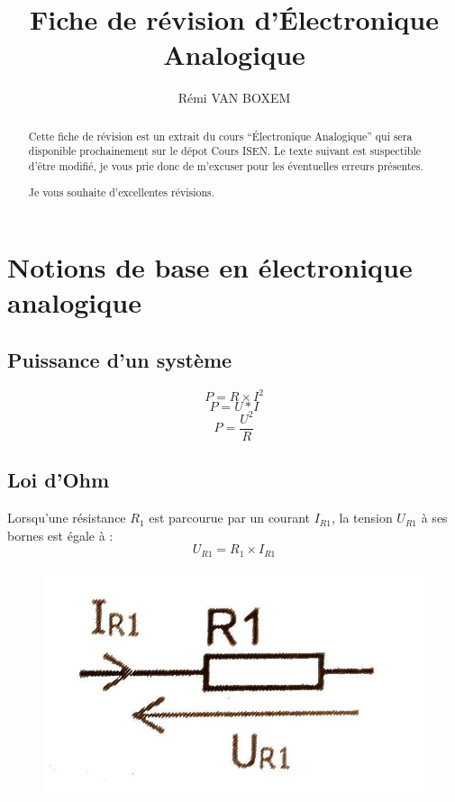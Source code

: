 \documentclass[a4paper,10pt]{article}
\title{Fiche de révision d'Électronique Analogique}
\author{Rémi VAN BOXEM}
\begin{document}
\maketitle

\begin{abstract}
Cette fiche de révision est un extrait du cours ``Électronique Analogique'' qui sera disponible prochainement sur le dépot Cours ISEN. Le texte suivant est suspectible d'être modifié, je vous prie donc de m'excuser pour les éventuelles erreurs présentes.

Je vous souhaite d'excellentes révisions.
\end{abstract}

\tableofcontents

\section{Notions de base en électronique analogique}

\subsection{Puissance d'un système}

$$P = R \times I^2$$ $$P=U*I$$ $$P = \frac{U^2}{R}$$

\subsection{Loi d'Ohm}
Lorsqu'une résistance $R_1$ est parcourue par un courant $I_{R1}$, la tension $U_{R1}$ à ses bornes est égale à : $$U_{R1}=R_1\times I_{R1}$$
\begin{figure}[h]
 \begin{center}
  \includegraphics[scale = 0.15]{ohm}
 \end{center}
\end{figure}
\end{document}
